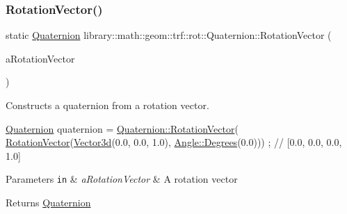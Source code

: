 \subsubsection{\texorpdfstring{Rotation\+Vector()}{RotationVector()}}
{\footnotesize\ttfamily static \hyperlink{classlibrary_1_1math_1_1geom_1_1trf_1_1rot_1_1_quaternion}{Quaternion} library\+::math\+::geom\+::trf\+::rot\+::\+Quaternion\+::\+Rotation\+Vector (\begin{DoxyParamCaption}\item[{const rot\+::\+Rotation\+Vector \&}]{a\+Rotation\+Vector }\end{DoxyParamCaption})\hspace{0.3cm}{\ttfamily [static]}}



Constructs a quaternion from a rotation vector. 


\begin{DoxyCode}
\hyperlink{classlibrary_1_1math_1_1geom_1_1trf_1_1rot_1_1_quaternion_aa7f459a08f5af38b9f7676a6bf36a21c}{Quaternion} quaternion = \hyperlink{classlibrary_1_1math_1_1geom_1_1trf_1_1rot_1_1_quaternion_a0580b35480348ca136deb7e295043d69}{Quaternion::RotationVector}(
      \hyperlink{classlibrary_1_1math_1_1geom_1_1trf_1_1rot_1_1_quaternion_a0580b35480348ca136deb7e295043d69}{RotationVector}(\hyperlink{namespacelibrary_1_1math_1_1obj_a977e84e9bf317a4e7dd9d6d671d6da2f}{Vector3d}(0.0, 0.0, 1.0), \hyperlink{classlibrary_1_1math_1_1geom_1_1_angle_a64aa53e8420aeb6f671d86c65c370bc8}{Angle::Degrees}(0.0))) ; \textcolor{comment}{//
       [0.0, 0.0, 0.0, 1.0]}
\end{DoxyCode}



\begin{DoxyParams}[1]{Parameters}
\mbox{\tt in}  & {\em a\+Rotation\+Vector} & A rotation vector \\
\hline
\end{DoxyParams}
\begin{DoxyReturn}{Returns}
\hyperlink{classlibrary_1_1math_1_1geom_1_1trf_1_1rot_1_1_quaternion}{Quaternion} 
\end{DoxyReturn}
\mbox{\label{classlibrary_1_1math_1_1geom_1_1trf_1_1rot_1_1_quaternion_a7b5045b46500d4f20e98ff29a9ed4c88}} 
